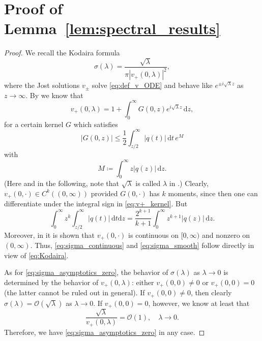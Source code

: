 \documentclass[11pt,twoside,reqno,centertags]{amsart}
\theoremstyle{definition}
\newcommand{\dd}{\mathrm d}
\begin{document}
\appendix

\section{Proof of Lemma~\ref{lem:spectral_results}}\label{appx:proof}
\begin{proof}
	We recall the Kodaira formula \cite[p. 940]{Kodaira49}
	\begin{equation}\label{eq:Kodaira}
		\sigma(\lambda)=\frac{\sqrt\lambda}{\pi|v_+(0,\lambda)|^2},
	\end{equation}
	where the Jost solutions $v_\pm$ solve \eqref{eq:def_v_ODE} and behave like $e^{\pm i\sqrt\lambda z}$ as $z\to\infty$. By \cite[Lem. 3.1.1]{Marchenko11} we know that
	\begin{equation}\label{eq:v+_kernel}
		v_+(0,\lambda) = 1 + \int_0^\infty G(0,z) e^{i\sqrt\lambda z}\,\dd z,
	\end{equation}
	for a certain kernel $G$ which satisfies
	\[|G(0,z)| \le \frac12 \int_{z/2}^\infty |q(t)|\,\dd t\, e^M\]
	with
	\[M\coloneqq\int_0^\infty z|q(z)|\,\dd z.\]
	(Here and in the following, note that $\sqrt\lambda$ is called $\lambda$ in \cite{Marchenko11}.) Clearly, $v_+(0,\cdot) \in C^k((0,\infty))$ provided $G(0,\cdot)$ has $k$ moments, since then one can differentiate under the integral sign in \eqref{eq:v+_kernel}. But
	\[\int_0^\infty z^k \int_{z/2}^\infty |q(t)|\,\dd t\dd z = \frac{2^{k+1}}{k+1} \int_0^\infty z^{k+1} |q(z)|\,\dd z.\]
	Moreover, in \cite{Kodaira49} it is shown that $v_+(0,\cdot)$ is continuous on $[0,\infty)$ and nonzero on $(0,\infty)$. Thus, \eqref{eq:sigma_continuous} and \eqref{eq:sigma_smooth} follow directly in view of \eqref{eq:Kodaira}.
	
	As for \eqref{eq:sigma_asymptotics_zero}, the behavior of $\sigma(\lambda)$ as $\lambda\to0$ is determined by the behavior of $v_+(0,\lambda)$: either $v_+(0,0)\ne0$ or $v_+(0,0)=0$ (the latter cannot be ruled out in general). If $v_+(0,0)\ne0$, then clearly $\sigma(\lambda)=\mathcal O(\sqrt\lambda)$ as $\lambda\to0$.
	If $v_+(0,0)=0$, however, we know at least that \cite[Lem. 3.1.6]{Marchenko11}
	\begin{equation}\label{eq:Jost_asymptotics_zero}
		\frac{\sqrt\lambda}{v_+(0,\lambda)} = \mathcal O(1), \quad \lambda\to0.
	\end{equation}
	Therefore, we have \eqref{eq:sigma_asymptotics_zero} in any case.
	

\end{proof}
\end{document}
